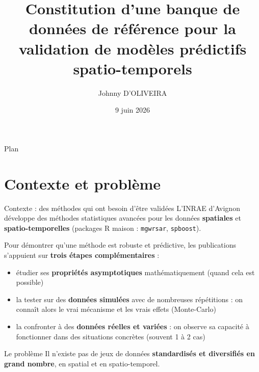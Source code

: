 \documentclass[aspectratio=169,11pt]{beamer}
\title[Banque de données spatio-temporelles]{Constitution d'une banque de données de référence pour la validation de modèles prédictifs spatio-temporels}
\author{Johnny D'OLIVEIRA}
\institute{Aix-Marseille School of Economics \\ \small Stage INRAE Avignon --- Unité Écodéveloppement \\ \small Encadrant : Ghislain Geniaux}
\date{9 juin 2026}
\begin{document}
\begin{frame}
    \titlepage
\end{frame}

\begin{frame}{Plan}
    \tableofcontents
\end{frame}

\section{Contexte et problème}
\begin{frame}{Contexte : des méthodes qui ont besoin d'être validées}
\small
L'INRAE d'Avignon développe des méthodes statistiques avancées pour les données
\textbf{spatiales} et \textbf{spatio-temporelles}
(packages R maison : \texttt{mgwrsar}, \texttt{spboost}).
\vspace{0.2cm}

Pour démontrer qu'une méthode est robuste et prédictive, les publications
s'appuient sur \textbf{trois étapes complémentaires} :
\begin{itemize}
    \item étudier ses \textbf{propriétés asymptotiques} mathématiquement \hfill{\footnotesize\textcolor{mygray}{(quand cela est possible)}}
    \item la tester sur des \textbf{données simulées} avec de nombreuses répétitions :
    on connaît alors le vrai mécanisme et les vrais effets
    \hfill{\footnotesize\textcolor{mygray}{(Monte-Carlo)}}
    \item la confronter à des \textbf{données réelles et variées} :
    on observe sa capacité à fonctionner dans des situations concrètes
    \hfill{\footnotesize\textcolor{mygray}{(souvent 1 à 2 cas)}}
\end{itemize}
\vspace{0.2cm}
\begin{block}{Le problème}
Il n'existe pas de jeux de données \textbf{standardisés et diversifiés en grand nombre}, en spatial et en spatio-temporel.
\end{block}
\end{frame}
\end{document}
